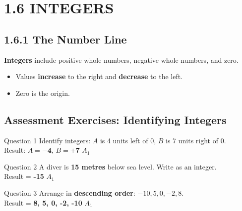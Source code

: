 \documentclass[12pt, a4paper, oneside]{article}
\begin{document}
\section*{1.6 INTEGERS}

\subsection*{1.6.1 The Number Line}

\begin{tcolorbox}[colback=lightgrey, colframe=primaryblue, title=\textbf{Concept Summary}, arc=5pt]
    \textbf{Integers} include positive whole numbers, negative whole numbers, and zero.
    \begin{itemize}
        \item Values \textbf{increase} to the right and \textbf{decrease} to the left.
        \item Zero is the origin.
    \end{itemize}
\end{tcolorbox}

\begin{center}
\end{center}

\subsection*{Assessment Exercises: Identifying Integers}

\begin{solvingbox}{Question 1}
Identify integers: $A$ is 4 units left of 0, $B$ is 7 units right of 0. \\
Result: $A = \mathbf{-4}$, $B = \mathbf{+7}$ \hfill $A_1$
\end{solvingbox}

\begin{solvingbox}{Question 2}
A diver is \textbf{15 metres} below sea level. Write as an integer. \\
Result = \textbf{-15} \hfill $A_1$
\end{solvingbox}

\begin{solvingbox}{Question 3}
Arrange in \textbf{descending order}: $-10, 5, 0, -2, 8$. \\
Result = \textbf{8, 5, 0, -2, -10} \hfill $A_1$
\end{solvingbox}
\end{document}
